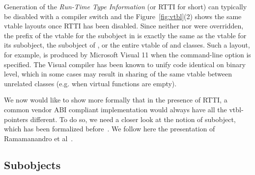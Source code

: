 Generation of the \emph{Run-Time Type Information} (or RTTI for short) can 
typically be disabled with a compiler switch and the Figure~\ref{fig:vtbl}(2) 
shows the same vtable layouts once RTTI has been disabled. Since neither 
 nor  were overridden, the prefix of the vtable for the 
 subobject in  is exactly the same as the vtable for its 
 subobject, the  subobject of , or the entire vtable of 
 and  classes. Such a layout, for example, is produced by 
Microsoft Visual \Cpp{} 11 when the command-line option  is specified. 
The Visual \Cpp{} compiler has been known to unify code identical on binary level, 
which in some cases may result in sharing of the same vtable between unrelated 
classes (e.g. when virtual functions are empty).


We now would like to show more formally that in the presence of RTTI, a common vendor \Cpp{} ABI 
compliant implementation would always have all the vtbl-pointers different. To do 
so, we need a closer look at the notion of subobject, which has been formalized 
before~\cite{RF95,WNST06,RDL11}. We follow here the presentation of Ramamanandro 
et al~\cite{RDL11}.

\subsection{Subobjects}
\label{sec:subobj}


